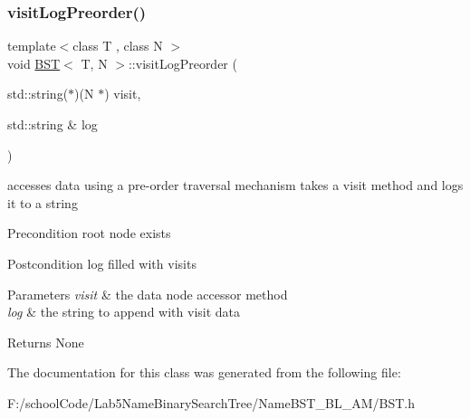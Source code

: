 \subsubsection{\texorpdfstring{visit\+Log\+Preorder()}{visitLogPreorder()}}
{\footnotesize\ttfamily template$<$class T , class N $>$ \\
void \hyperlink{class_b_s_t}{B\+ST}$<$ T, N $>$\+::visit\+Log\+Preorder (\begin{DoxyParamCaption}\item[{std\+::string($\ast$)(N $\ast$)}]{visit,  }\item[{std\+::string \&}]{log }\end{DoxyParamCaption})}

accesses data using a pre-\/order traversal mechanism takes a visit method and logs it to a string \begin{DoxyPrecond}{Precondition}
root node exists 
\end{DoxyPrecond}
\begin{DoxyPostcond}{Postcondition}
log filled with visits 
\end{DoxyPostcond}

\begin{DoxyParams}{Parameters}
{\em visit} & the data node accessor method \\
\hline
{\em log} & the string to append with visit data \\
\hline
\end{DoxyParams}
\begin{DoxyReturn}{Returns}
None 
\end{DoxyReturn}


The documentation for this class was generated from the following file\+:\begin{DoxyCompactItemize}
\item 
F\+:/school\+Code/\+Lab5\+Name\+Binary\+Search\+Tree/\+Name\+B\+S\+T\+\_\+\+B\+L\+\_\+\+A\+M/B\+S\+T.\+h\end{DoxyCompactItemize}
